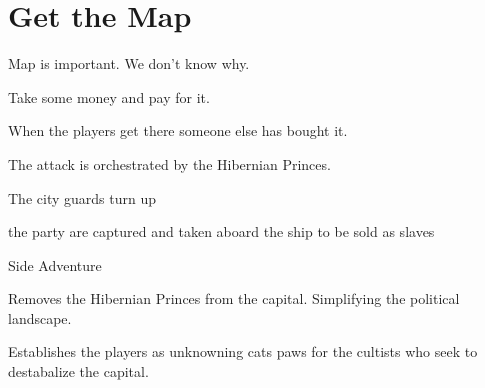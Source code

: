 \documentclass[a4paper]{dnd5}
\begin{document}
\section*{Get the Map}

\begin{precis}
\item Map is important.  We don't know why.
\item Take some money and pay for it.
\item When the players get there someone else has bought it.
\item The attack is orchestrated by the Hibernian Princes.
\end{precis}


\begin{outs} 
\item The city guards turn up
\item the party are captured and taken aboard the ship to be sold as slaves
\end{outs}

\begin{purpose}
\item Side Adventure
\item Removes the Hibernian Princes from the capital.  Simplifying the political landscape.
\item Establishes the players as unknowning cats paws for the cultists who seek to destabalize the capital.
\end{purpose}
     
\end{document}
